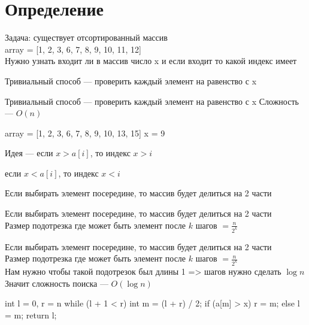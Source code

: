 \section{Определение}

\begin{frame}
    Задача: существует отсортированный массив\\
    array = [1, 2, 3, 6, 7, 8, 9, 10, 11, 12]\\
    Нужно узнать входит ли в массив число x и если входит то какой индекс имеет
\end{frame}

\begin{frame}
    Тривиальный способ --- проверить каждый элемент на равенство с x
\end{frame}

\begin{frame}
    Тривиальный способ --- проверить каждый элемент на равенство с x
    \quad Сложность --- $O(n)$
\end{frame}

\begin{frame}
    \center \huge array = [1, 2, 3, 6, 7, 8, 9, 10, 13, 15]
    \center \huge x = 9
\end{frame}

\begin{frame}
    \center \huge \quad Идея --- если $x > a[i]$, то индекс $x > i$

    \quad если $x < a[i]$, то индекс $x < i$
\end{frame}

\begin{frame}
    Если выбирать элемент посередине, то массив будет делиться на 2 части
\end{frame}

\begin{frame}
    Если выбирать элемент посередине, то массив будет делиться на 2 части\\
    \quad Размер подотрезка где может быть элемент после $k$ шагов $= \frac{n}{2^k}$\\
\end{frame}

\begin{frame}
    Если выбирать элемент посередине, то массив будет делиться на 2 части\\
    \quad Размер подотрезка где может быть элемент после $k$ шагов $= \frac{n}{2^k}$\\
    \quad Нам нужно чтобы такой подотрезок был длины 1 => шагов нужно сделать $\log n$\\
    \quad Значит сложность поиска --- $O(\log n)$
\end{frame}

\begin{frame}[fragile]
    \begin{cpp}
int l = 0, r = n
while (l + 1 < r) {
    int m = (l + r) / 2;
    if (a[m] > x) {
        r = m;
    } else {
        l = m;
    }
}
return l;
    \end{cpp}
\end{frame}